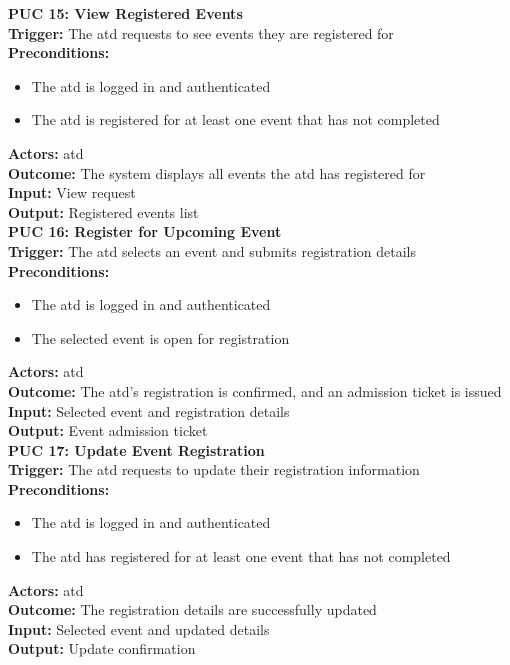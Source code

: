 \documentclass[12pt]{article}
\begin{document}
{\textbf{PUC 15: View Registered Events} \\
\textbf{Trigger:} The \gls{atd} requests to see events they are registered for \\
\textbf{Preconditions:}
\begin{itemize}
  \item The \gls{atd} is logged in and authenticated
  \item The \gls{atd} is registered for at least one event that has not completed
\end{itemize}
\textbf{Actors:} \Gls{atd} \\
\textbf{Outcome:} The system displays all events the \gls{atd} has registered for \\
\textbf{Input:} View request \\
\textbf{Output:} Registered events list \\[1em]

\textbf{PUC 16: Register for Upcoming Event} \\
\textbf{Trigger:} The \gls{atd} selects an event and submits registration details \\
\textbf{Preconditions:}
\begin{itemize}
  \item The \gls{atd} is logged in and authenticated
  \item The selected event is open for registration
\end{itemize}
\textbf{Actors:} \Gls{atd} \\
\textbf{Outcome:} The \gls{atd}’s registration is confirmed, and an admission ticket is issued \\
\textbf{Input:} Selected event and registration details \\
\textbf{Output:} Event admission ticket \\[1em]

\textbf{PUC 17: Update Event Registration} \\
\textbf{Trigger:} The \gls{atd} requests to update their registration information \\
\textbf{Preconditions:}
\begin{itemize}
  \item The \gls{atd} is logged in and authenticated
  \item The \gls{atd} has registered for at least one event that has not completed
\end{itemize}
\textbf{Actors:} \Gls{atd} \\
\textbf{Outcome:} The registration details are successfully updated \\
\textbf{Input:} Selected event and updated details \\
\textbf{Output:} Update confirmation \\[1em]

}
\end{document}
